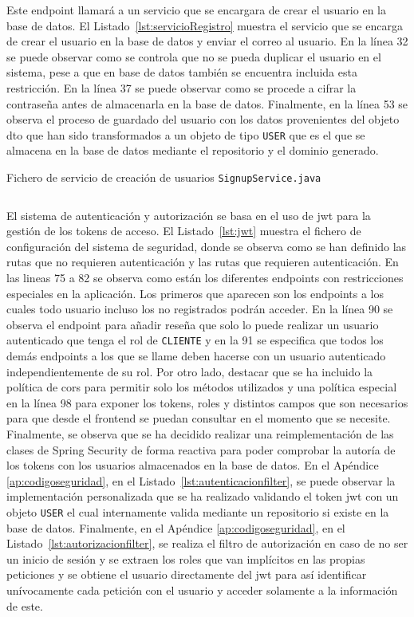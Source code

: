 Este endpoint llamará a un servicio que se encargara de crear el usuario en la base de datos. El Listado~\ref{lst:servicioRegistro} muestra el servicio que se encarga de crear el usuario en la base de datos y enviar el correo al usuario. En la línea 32 se puede observar como se controla que no se pueda duplicar el usuario en el sistema, pese a que en base de datos también se encuentra incluida esta restricción. En la línea 37 se puede observar como se procede a cifrar la contraseña antes de almacenarla en la base de datos. Finalmente, en la línea 53 se observa el proceso de guardado del usuario con los datos provenientes del objeto \gls{dto} que han sido transformados a un objeto de tipo \texttt{\texttt{USER}} que es el que se almacena en la base de datos mediante el repositorio y el dominio generado.
\begin{longlisting}
    \caption{Fichero de servicio de creación de usuarios {\tt SignupService.java}}
    \inputminted[highlightlines={32,36,54}, firstline=29, lastline=64]{java}{../backend/elrincondeeva/elrincondeeva/src/main/java/es/uv/hemal/elrincondeeva/services/SignupService.java}
    \label{lst:servicioRegistro}
\end{longlisting}
El sistema de autenticación y autorización se basa en el uso de \gls{jwt} para la gestión de los tokens de acceso. El Listado~\ref{lst:jwt} muestra el fichero de configuración del sistema de seguridad, donde se observa como se han definido las rutas que no requieren autenticación y las rutas que requieren autenticación. En las lineas 75 a 82 se observa como están los diferentes endpoints con restricciones especiales en la aplicación. Los primeros que aparecen son los endpoints a los cuales todo usuario incluso los no registrados podrán acceder. En la línea 90 se observa el endpoint para añadir reseña que solo lo puede realizar un usuario autenticado que tenga el rol de \texttt{CLIENTE} y en la 91 se especifica que todos los demás endpoints a los que se llame deben hacerse con un usuario autenticado independientemente de su rol. Por otro lado, destacar que se ha incluido la política de \gls{cors} para permitir solo los métodos utilizados y una política especial en la línea 98 para exponer los tokens, roles y distintos campos que son necesarios para que desde el \gls{frontend} se puedan consultar en el momento que se necesite. Finalmente, se observa que se ha decidido realizar una reimplementación de las clases de Spring Security \cite{springsecurity} de forma reactiva para poder comprobar la autoría de los tokens con los usuarios almacenados en la base de datos. En el Apéndice \ref{ap:codigoseguridad}, en el Listado~\ref{lst:autenticacionfilter}, se puede observar la implementación personalizada que se ha realizado validando el token \gls{jwt} con un objeto \texttt{USER} el cual internamente valida mediante un repositorio si existe en la base de datos. Finalmente, en el Apéndice \ref{ap:codigoseguridad}, en el Listado~\ref{lst:autorizacionfilter}, se realiza el filtro de autorización en caso de no ser un inicio de sesión y se extraen los roles que van implícitos en las propias peticiones y se obtiene el usuario directamente del \gls{jwt} para así identificar unívocamente cada petición con el usuario y acceder solamente a la información de este. 

